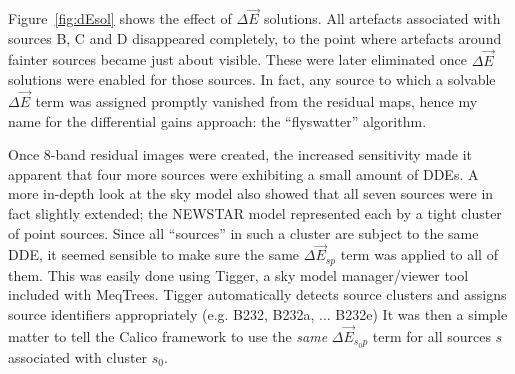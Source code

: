 \documentclass{aa}
\newcommand{\jones}[2]{\vec {#1}_{#2}}
\begin{document}
Figure~\ref{fig:dEsol} shows the effect of $\Delta\jones{E}{}$ solutions. All artefacts associated with sources B, C and D disappeared completely, to the point where artefacts around fainter sources became just about visible. These were later eliminated once $\Delta\jones{E}{}$ solutions were enabled for those sources. In fact, any source to which a solvable $\Delta\jones{E}{}$ term was assigned promptly vanished from the residual maps, hence my name for the differential gains approach: the ``flyswatter'' algorithm. 

Once 8-band residual images were created, the increased sensitivity made it apparent that four more sources were exhibiting a small amount of DDEs. A more in-depth look at the sky model also showed that all seven sources were in fact slightly extended; the NEWSTAR model represented each by a tight cluster of point sources. Since all ``sources'' in such a cluster are subject to the same DDE, it seemed sensible to make sure the same $\Delta\jones{E}{sp}$ term was applied to all of them. This was easily done using Tigger, a sky model manager/viewer tool included with MeqTrees. Tigger automatically detects source clusters and assigns source identifiers appropriately (e.g. B232, B232a, ...  B232e) It was then a simple matter to tell the Calico framework to use the \emph{same} $\Delta\jones{E}{s_0 p}$ term for all sources $s$ associated with cluster $s_0$. 
\end{document}
